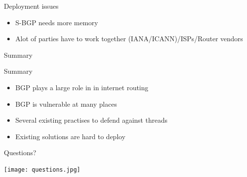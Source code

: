 \documentclass[notes=hide,yellow]{beamer}
\begin{document}
\begin{frame}{Deployment issues}
	
	\begin{itemize}
		\item S-BGP needs more memory

		\item Alot of parties have to work together (IANA/ICANN)/ISPs/Router vendors
	\end{itemize}
\end{frame}


\begin{frame}{Summary}
	\begin{block}{Summary}
	\begin{itemize}
	\item BGP plays a large role in in internet routing
	\item BGP is vulnerable at many places
	\item Several existing practises to defend against threads
	\item Existing solutions are hard to deploy
	\end{itemize}
	\end{block}
\end{frame}

\begin{frame}
	\begin{center}
	\large Questions?
\end{center}
	\begin{center}
	\texttt{[image: questions.jpg]}
	\end{center}
\end{frame}
\end{document}
